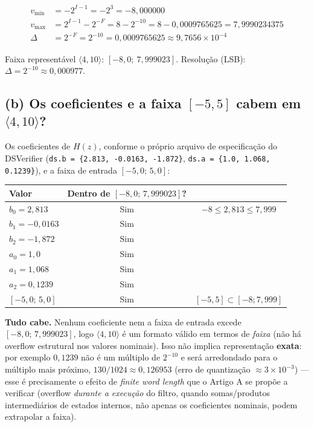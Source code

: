 \documentclass[12pt,a4paper]{article}
\newcommand{\vv}[1]{\texttt{#1}}
\begin{document}
\begin{align*}
  v_{\min} &= -2^{I-1} = -2^{3} = -8{,}000000 \\
  v_{\max} &= 2^{I-1} - 2^{-F} = 8 - 2^{-10} = 8 - 0{,}0009765625 = 7{,}9990234375 \\
  \Delta   &= 2^{-F} = 2^{-10} = 0{,}0009765625 \approx 9{,}7656\times10^{-4}
\end{align*}

\begin{tcolorbox}[resultbox]
Faixa representável $\langle4,10\rangle$: $[-8{,}0;\ 7{,}999023]$. Resolu\c{c}\~ao (LSB):
$\Delta = 2^{-10} \approx 0{,}000977$.
\end{tcolorbox}

\subsection{(b) Os coeficientes e a faixa $[-5,5]$ cabem em $\langle4,10\rangle$?}

Os coeficientes de $H(z)$, conforme o pr\'oprio arquivo de especifica\c{c}\~ao do DSVerifier
(\vv{ds.b = \{2.813, -0.0163, -1.872\}}, \vv{ds.a = \{1.0, 1.068, 0.1239\}}), e a faixa de
entrada $[-5{,}0;\,5{,}0]$:

\begin{center}
\begin{tabular}{@{}lcc@{}}
\toprule
Valor & Dentro de $[-8{,}0;\,7{,}999023]$? & \\
\midrule
$b_0=2{,}813$   & Sim & $-8 \le 2{,}813 \le 7{,}999$ \\
$b_1=-0{,}0163$ & Sim & \\
$b_2=-1{,}872$  & Sim & \\
$a_0=1{,}0$     & Sim & \\
$a_1=1{,}068$   & Sim & \\
$a_2=0{,}1239$  & Sim & \\
$[-5{,}0;\,5{,}0]$ & Sim & $[-5,5]\subset[-8;7{,}999]$ \\
\bottomrule
\end{tabular}
\end{center}

\begin{tcolorbox}[resultbox]
\textbf{Tudo cabe.} Nenhum coeficiente nem a faixa de entrada excede $[-8{,}0;\,7{,}999023]$,
logo $\langle4,10\rangle$ \'e um formato v\'alido em termos de \emph{faixa} (n\~ao h\'a
overflow estrutural nos valores nominais). Isso n\~ao implica representa\c{c}\~ao
\textbf{exata}: por exemplo $0{,}1239$ n\~ao \'e um m\'ultiplo de $2^{-10}$ e ser\'a
arredondado para o m\'ultiplo mais pr\'oximo, $130/1024 \approx 0{,}126953$ (erro de
quantiza\c{c}\~ao $\approx 3\times10^{-3}$) --- esse \'e precisamente o efeito de
\emph{finite word length} que o Artigo A se prop\~oe a verificar (overflow \emph{durante a
execu\c{c}\~ao} do filtro, quando somas/produtos intermedi\'arios de estados internos, n\~ao
apenas os coeficientes nominais, podem extrapolar a faixa).
\end{tcolorbox}
\end{document}
